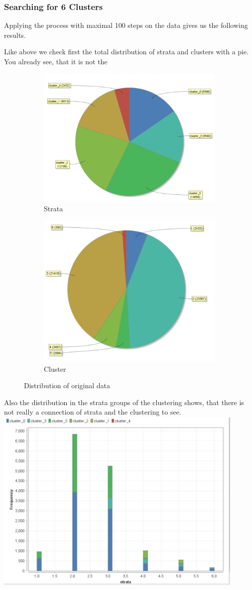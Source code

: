 \subsubsection{Searching for 6 Clusters}
Applying the process with maximal 100 steps on the data gives us the following results.

Like above we check first the total distribution of strata and clusters with a pie. You already see, that it is not the 
\begin{figure}[h]
\centering
\begin{subfigure}{.5\textwidth}
  \centering
  \includegraphics[width=.4\linewidth]{../Miriam-RapidMiner/vectorclusteringcluster.PNG}
  \caption{Strata}
  \label{fig:OrgSt}
\end{subfigure}%
\begin{subfigure}{.5\textwidth}
  \centering
  \includegraphics[width=.4\linewidth]{../Miriam-RapidMiner/vectorclusteringstrata.PNG}
  \caption{Cluster}
  \label{fig:OrgCl}
\end{subfigure}
\caption{Distribution of original data}
\label{fig:OrgDist}
\end{figure}

Also the distribution in the strata groups of the clustering shows, that there is not really a connection of strata and the clustering to see.
\includegraphics[width=0.9\textwidth]{../Miriam-RapidMiner/vectorClustering.PNG}

